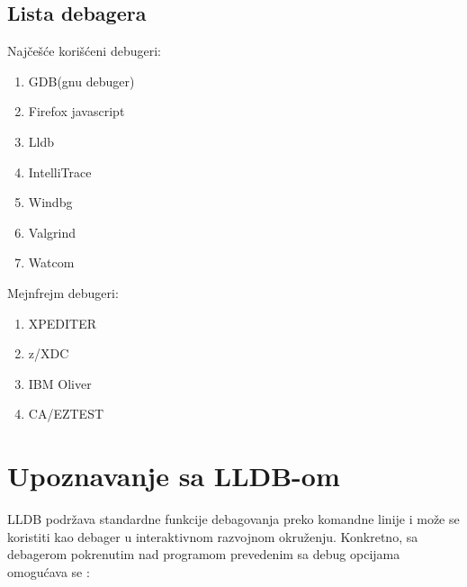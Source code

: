 \documentclass[a4paper]{article}
\begin{document}
\subsection{Lista debagera}
\label{sec:Lista debagera}

Najčešće korišćeni debugeri\cite{ll_best_debuggers}\cite{up_best_debuggers}:
\begin{enumerate}
	\item GDB(gnu debuger)
	\item Firefox javascript 
	\item Lldb
	\item IntelliTrace
	\item Windbg
	\item Valgrind
	\item Watcom
\end{enumerate}
Mejnfrejm debugeri\cite{ll_best_debuggers}\cite{up_best_debuggers}:
\begin{enumerate}
	\item XPEDITER
	\item z/XDC
	\item IBM Oliver
	\item CA/EZTEST
\end{enumerate}

\section{Upoznavanje sa LLDB-om}
LLDB podržava standardne funkcije debagovanja preko komandne linije i može se
koristiti kao debager u interaktivnom razvojnom okruženju. Konkretno, sa
debagerom pokrenutim nad programom prevedenim sa debug opcijama omogućava
se \cite{lldb_to_gdb_map}:
\end{document}

